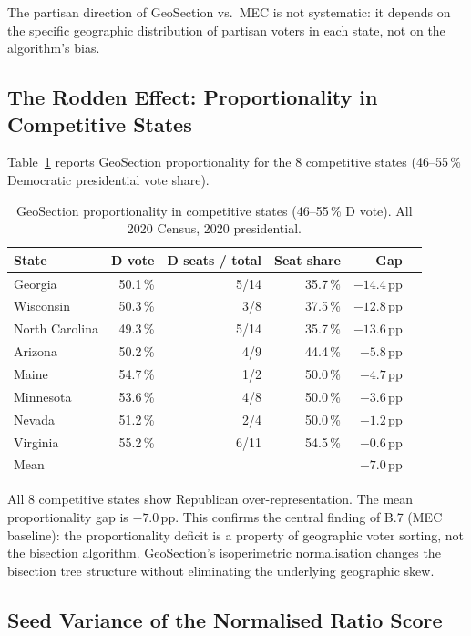 The partisan direction of GeoSection vs.\ MEC is not systematic: it depends
on the specific geographic distribution of partisan voters in each state,
not on the algorithm's bias.

\subsection{The Rodden Effect: Proportionality in Competitive States}

Table~\ref{tab:prop-competitive} reports GeoSection proportionality for
the 8 competitive states (46--55\,\% Democratic presidential vote share).

\begin{table}[h]
\centering
\caption{GeoSection proportionality in competitive states (46--55\,\% D vote).
  All 2020 Census, 2020 presidential.}
\label{tab:prop-competitive}
\begin{tabular}{lrrrrr}
\toprule
State & D vote & D seats / total & Seat share & Gap \\
\midrule
Georgia       & 50.1\,\% & 5/14 & 35.7\,\% & $-14.4$\,pp \\
Wisconsin     & 50.3\,\% & 3/8  & 37.5\,\% & $-12.8$\,pp \\
North Carolina & 49.3\,\% & 5/14 & 35.7\,\% & $-13.6$\,pp \\
Arizona       & 50.2\,\% & 4/9  & 44.4\,\% & $-5.8$\,pp \\
Maine         & 54.7\,\% & 1/2  & 50.0\,\% & $-4.7$\,pp \\
Minnesota     & 53.6\,\% & 4/8  & 50.0\,\% & $-3.6$\,pp \\
Nevada        & 51.2\,\% & 2/4  & 50.0\,\% & $-1.2$\,pp \\
Virginia      & 55.2\,\% & 6/11 & 54.5\,\% & $-0.6$\,pp \\
\midrule
Mean          &          &      &          & $-7.0$\,pp \\
\bottomrule
\end{tabular}
\end{table}

All 8 competitive states show Republican over-representation.
The mean proportionality gap is $-7.0$\,pp.
This confirms the central finding of B.7 (MEC baseline): the proportionality
deficit is a property of geographic voter sorting, not the bisection algorithm.
GeoSection's isoperimetric normalisation changes the bisection tree structure
without eliminating the underlying geographic skew.

\subsection{Seed Variance of the Normalised Ratio Score}
\label{sec:seed-variance}

